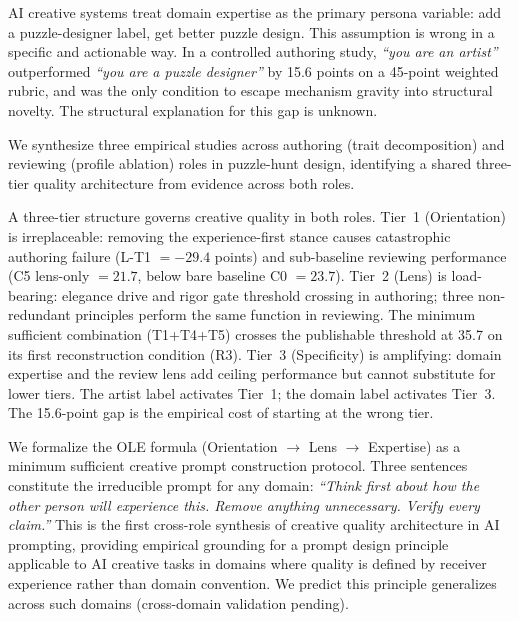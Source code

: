 AI creative systems treat domain expertise as the primary persona variable:
add a puzzle-designer label, get better puzzle design.
This assumption is wrong in a specific and actionable way.
In a controlled authoring study, \textit{``you are an artist''} outperformed
\textit{``you are a puzzle designer''} by 15.6 points on a 45-point weighted rubric,
and was the only condition to escape mechanism gravity into structural novelty.
The structural explanation for this gap is unknown.

We synthesize three empirical studies across authoring (trait decomposition) and reviewing
(profile ablation) roles in puzzle-hunt design, identifying a shared three-tier quality
architecture from evidence across both roles.

A three-tier structure governs creative quality in both roles.
Tier~1 (Orientation) is irreplaceable: removing the experience-first stance causes catastrophic
authoring failure (L-T1 $= -29.4$ points) and sub-baseline reviewing performance
(C5 lens-only $= 21.7$, below bare baseline C0 $= 23.7$).
Tier~2 (Lens) is load-bearing: elegance drive and rigor gate threshold crossing in authoring;
three non-redundant principles perform the same function in reviewing.
The minimum sufficient combination (T1+T4+T5) crosses the publishable threshold at 35.7
on its first reconstruction condition (R3).
Tier~3 (Specificity) is amplifying: domain expertise and the review lens add ceiling performance
but cannot substitute for lower tiers.
The artist label activates Tier~1; the domain label activates Tier~3.
The 15.6-point gap is the empirical cost of starting at the wrong tier.

We formalize the OLE formula (Orientation $\to$ Lens $\to$ Expertise) as a minimum
sufficient creative prompt construction protocol.
Three sentences constitute the irreducible prompt for any domain:
\textit{``Think first about how the other person will experience this.
Remove anything unnecessary.
Verify every claim.''}
This is the first cross-role synthesis of creative quality architecture in AI prompting,
providing empirical grounding for a prompt design principle applicable to AI creative tasks
in domains where quality is defined by receiver experience rather than domain convention.
We predict this principle generalizes across such domains (cross-domain validation pending).
